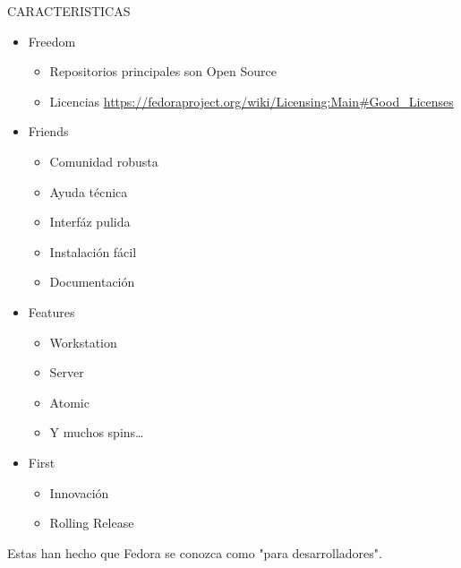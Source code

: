 \documentclass[presentation]{beamer}
\begin{document}
\begin{frame}[label=sec-9]{CARACTERISTICAS}
\begin{itemize}
\item Freedom
\begin{itemize}
\item Repositorios principales son Open Source
\item Licencias \url{https://fedoraproject.org/wiki/Licensing:Main#Good_Licenses}
\end{itemize}
\item Friends
\begin{itemize}
\item Comunidad robusta
\item Ayuda técnica
\item Interfáz pulida
\item Instalación fácil
\item Documentación
\end{itemize}
\item Features 
\begin{itemize}
\item Workstation
\item Server
\item Atomic
\item Y muchos spins\ldots{}
\end{itemize}

\item First 
\begin{itemize}
\item Innovación
\item Rolling Release
\end{itemize}
\end{itemize}

Estas han hecho que Fedora se conozca como "para desarrolladores".
\end{frame}
\end{document}
